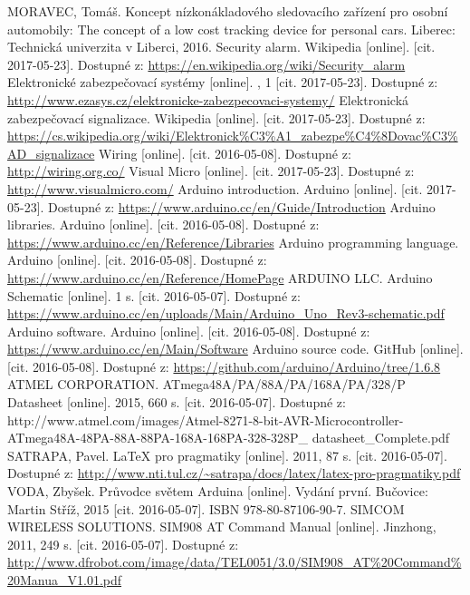 \documentclass[FM,DP]{tulthesis}  %
\begin{document}
\begin{thebibliography}{10}
MORAVEC, Tomáš. Koncept nízkonákladového sledovacího zařízení pro osobní automobily: The concept of a low cost tracking device for personal cars. Liberec: Technická univerzita v Liberci, 2016.
Security alarm. Wikipedia [online]. [cit. 2017-05-23]. Dostupné z: \url{https://en.wikipedia.org/wiki/Security_alarm}
Elektronické zabezpečovací systémy [online]. , 1 [cit. 2017-05-23]. Dostupné z: \url{http://www.ezasys.cz/elektronicke-zabezpecovaci-systemy/}
Elektronická zabezpečovací signalizace. Wikipedia [online]. [cit. 2017-05-23]. Dostupné z: \url{https://cs.wikipedia.org/wiki/Elektronick\%C3\%A1\_zabezpe\%C4\%8Dovac\%C3\%AD_signalizace}
Wiring [online]. [cit. 2016-05-08]. Dostupné z: \url{http://wiring.org.co/}
Visual Micro [online]. [cit. 2017-05-23]. Dostupné z: \url{http://www.visualmicro.com/}
Arduino introduction. Arduino [online]. [cit. 2017-05-23]. Dostupné z: \url{https://www.arduino.cc/en/Guide/Introduction}
Arduino libraries. Arduino [online]. [cit. 2016-05-08]. Dostupné z: \url{https://www.arduino.cc/en/Reference/Libraries}
Arduino programming language. Arduino [online]. [cit. 2016-05-08]. Dostupné z: \url{https://www.arduino.cc/en/Reference/HomePage}
ARDUINO LLC. Arduino Schematic [online]. 1 s. [cit. 2016-05-07]. Dostupné z: \url{https://www.arduino.cc/en/uploads/Main/Arduino\_Uno\_Rev3-schematic.pdf}
 Arduino software. Arduino [online]. [cit. 2016-05-08]. Dostupné z: \url{https://www.arduino.cc/en/Main/Software}
Arduino source code. GitHub [online]. [cit. 2016-05-08]. Dostupné z: \url{https://github.com/arduino/Arduino/tree/1.6.8}
ATMEL CORPORATION. ATmega48A/PA/88A/PA/168A/PA/328/P Datasheet [online]. 2015, 660 s. [cit. 2016-05-07]. Dostupné z: http://www.atmel.com/images/Atmel-8271-8-bit-AVR-Microcontroller-ATmega48A-48PA-88A-88PA-168A-168PA-328-328P\_ datasheet\_Complete.pdf
SATRAPA, Pavel. LaTeX pro pragmatiky [online]. 2011, 87 s. [cit. 2016-05-07]. Dostupné z: \url{http://www.nti.tul.cz/~satrapa/docs/latex/latex-pro-pragmatiky.pdf}
VODA, Zbyšek. Průvodce světem Arduina [online]. Vydání první. Bučovice: Martin Stříž, 2015 [cit. 2016-05-07]. ISBN 978-80-87106-90-7.
SIMCOM WIRELESS SOLUTIONS. SIM908 AT Command Manual [online]. Jinzhong, 2011, 249 s. [cit. 2016-05-07]. Dostupné z: \url{http://www.dfrobot.com/image/data/TEL0051/3.0/SIM908\_AT\%20Command\%20Manua\_V1.01.pdf}

\end{thebibliography}
\end{document}
